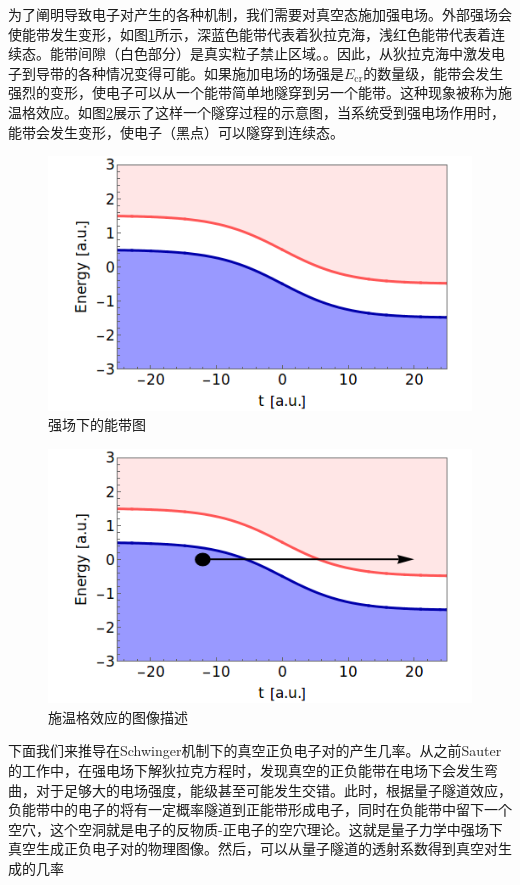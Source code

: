 为了阐明导致电子对产生的各种机制，我们需要对真空态施加强电场。外部强场会使能带发生变形，如图\ref{tu5}所示，深蓝色能带代表着狄拉克海，浅红色能带代表着连续态。能带间隙（白色部分）是真实粒子禁止区域。。因此，从狄拉克海中激发电子到导带的各种情况变得可能。如果施加电场的场强是$E_{\mathrm{cr}}$的数量级，能带会发生强烈的变形，使电子可以从一个能带简单地隧穿到另一个能带。这种现象被称为施温格效应。如图\ref{tu6}展示了这样一个隧穿过程的示意图，当系统受到强电场作用时，能带会发生变形，使电子（黑点）可以隧穿到连续态。

\begin{figure}
  \centering
  \includegraphics[width=0.8\linewidth]{figures/fig/fig1.5.png}
  \caption{强场下的能带图}
  \label{tu5}
\end{figure}

\begin{figure}
  \centering
  \includegraphics[width=0.8\linewidth]{figures/fig/fig1.6.png}
  \caption{施温格效应的图像描述}
  \label{tu6}
\end{figure}

下面我们来推导在Schwinger机制下的真空正负电子对的产生几率。从之前Sauter的工作中，在强电场下解狄拉克方程时，发现真空的正负能带在电场下会发生弯曲，对于足够大的电场强度，能级甚至可能发生交错。此时，根据量子隧道效应，负能带中的电子的将有一定概率隧道到正能带形成电子，同时在负能带中留下一个空穴，这个空洞就是电子的反物质-正电子的空穴理论。这就是量子力学中强场下真空生成正负电子对的物理图像。然后，可以从量子隧道的透射系数得到真空对生成的几率

